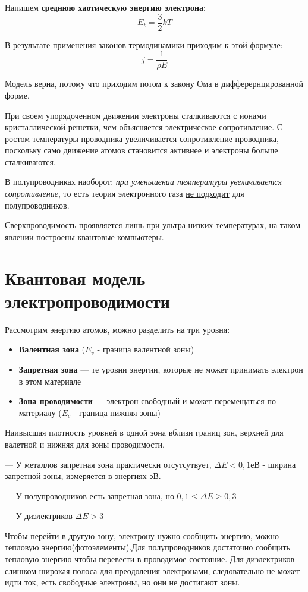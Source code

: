\documentclass[../main.tex]{subfiles}
\begin{document}
Напишем \textbf{среднюю хаотическую энергию электрона}:
\[E_t = \frac{3}{2} kT\]

В результате применения законов термодинамики приходим к этой формуле:
\[j = \frac{1}{\rho E}\]

Модель верна, потому что приходим потом к закону Ома в дифферернцированной форме.

При своем упорядоченном движении электроны сталкиваются с ионами кристаллической решетки, чем объясняется электрическое сопротивление. С ростом
температуры проводника увеличивается сопротивление проводника, поскольку само движение атомов становится активнее и электроны больше сталкиваются.

В полупроводниках наоборот: \textit{при уменьшении температуры увеличивается сопротивление}, то есть теория электронного газа \underline{не подходит} для полупроводников.

Сверхпроводимость  проявляется лишь при ультра низких температурах, на таком явлении построены квантовые компьютеры.

\section{Квантовая модель электропроводимости}
Рассмотрим энергию атомов, можно разделить на три уровня:
\begin{itemize}
    \item \textbf{Валентная зона} ($E_v$ - граница валентной зоны)
    \item \textbf{Запретная зона} --- те уровни энергии, которые не может принимать электрон в этом материале
    \item \textbf{Зона проводимости} --- электрон свободный и может перемещаться по материалу ($E_c$ - граница нижняя зоны)
\end{itemize}

Наивысшая плотность уровней в одной зона вблизи границ зон, верхней для валетной и нижняя для зоны проводимости.

\vspace{15px}

--- У металлов запретная зона практически отсутсутвует, $\Delta E < 0,1 $еВ - ширина запретной зоны, измеряется в энергиях эВ.

--- У полупроводников есть запретная зона, но $ 0,1 \leq \Delta E \geq 0,3$

--- У диэлектриков $\Delta E > 3 $

Чтобы перейти в другую зону, электрону нужно сообщить энергию, можно тепловую энергию(фотоэлементы).Для полупроводников 
достаточно сообщить тепловую энергию чтобы перевести в проводимое состояние. Для диэлектриков слишком широкая полоса для преодоления электронами, следовательно
не может идти ток, есть свободные электроны, но они не достигают зоны.
\end{document}
